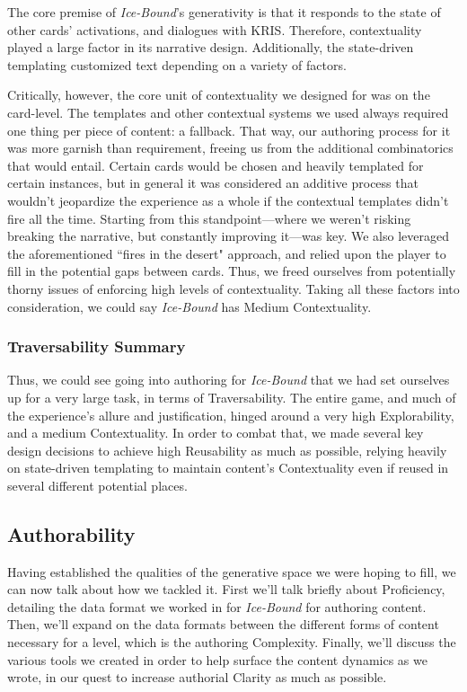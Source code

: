 The core premise of \textit{Ice-Bound}'s generativity is that it responds to the state of other cards' activations, and dialogues with KRIS. Therefore, contextuality played a large factor in its narrative design. Additionally, the state-driven templating customized text depending on a variety of factors.

Critically, however, the core unit of contextuality we designed for was on the card-level. The templates and other contextual systems we used always required one thing per piece of content: a fallback. That way, our authoring process for it was more garnish than requirement, freeing us from the additional combinatorics that would entail. Certain cards would be chosen and heavily templated for certain instances, but in general it was considered an additive process that wouldn't jeopardize the experience as a whole if the contextual templates didn't fire all the time. Starting from this standpoint---where we weren't risking breaking the narrative, but constantly improving it---was key. We also leveraged the aforementioned ``fires in the desert" approach, and relied upon the player to fill in the potential gaps between cards. Thus, we freed ourselves from potentially thorny issues of enforcing high levels of contextuality. Taking all these factors into consideration, we could say \textit{Ice-Bound} has Medium Contextuality.

\subsubsection{Traversability Summary}\label{subsubsec:icebound-traversability-summary}

Thus, we could see going into authoring for \textit{Ice-Bound} that we had set ourselves up for a very large task, in terms of Traversability. The entire game, and much of the experience's allure and justification, hinged around a very high Explorability, and a medium Contextuality. In order to combat that, we made several key design decisions to achieve high Reusability as much as possible, relying heavily on state-driven templating to maintain content's Contextuality even if reused in several different potential places.

\subsection{Authorability}\label{subsec:icebound-authorability}

Having established the qualities of the generative space we were hoping to fill, we can now talk about how we tackled it. First we'll talk briefly about Proficiency, detailing the data format we worked in for \textit{Ice-Bound} for authoring content. Then, we'll expand on the data formats between the different forms of content necessary for a level, which is the authoring Complexity. Finally, we'll discuss the various tools we created in order to help surface the content dynamics as we wrote, in our quest to increase authorial Clarity as much as possible.

